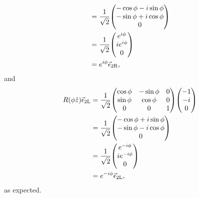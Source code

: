 \documentclass[12pt]{article}
\begin{document}
\begin{enumerate}[label=(\alph*)]
\begin{align*}
        &= \frac{1}{\sqrt{2}}\mqty(-\cos\phi - i\sin\phi \\ -\sin\phi + i\cos\phi \\ 0) \\
        &= \frac{1}{\sqrt{2}}\mqty(e^{i\phi} \\ ie^{i\phi} \\ 0) \\
        &= e^{i\phi}\vec{\epsilon}_{2\text{R}},
    \end{align*}
    and
    \begin{align*}
        R(\phi\hat{z})\vec{\epsilon}_{2\text{L}} &= \frac{1}{\sqrt{2}}\mqty(\cos\phi & -\sin\phi & 0 \\ \sin\phi & \cos\phi & 0 \\ 0 & 0 & 1)\mqty(-1\\-i\\0) \\
        &= \frac{1}{\sqrt{2}}\mqty(-\cos\phi + i\sin\phi \\ -\sin\phi - i\cos\phi \\ 0) \\
        &= \frac{1}{\sqrt{2}}\mqty(e^{-i\phi} \\ ie^{-i\phi} \\ 0) \\
        &= e^{-i\phi}\vec{\epsilon}_{2\text{L}},
    \end{align*}
    as expected.

\end{enumerate}
\end{document}
